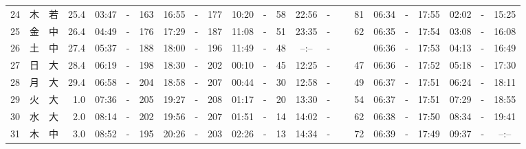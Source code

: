 \documentclass[12pt,a4j]{jsarticle}
\begin{document}
\begin{table}[htbp]
\begin{center}
{\begin{tabular}{|rc|cr|ccrccr|ccrccr|ccc|ccc|}
24 & 木 & 若 & 25.4 &  03:47 &-& 163 &  16:55 &-& 177 &  10:20 &-&  58 &  22:56 &-&  81 & 06:34 & -& 17:55 & 02:02 & -& 15:25 \\
25 & 金 & 中 & 26.4 &  04:49 &-& 176 &  17:29 &-& 187 &  11:08 &-&  51 &  23:35 &-&  62 & 06:35 & -& 17:54 & 03:08 & -& 16:08 \\
26 & 土 & 中 & 27.4 &  05:37 &-& 188 &  18:00 &-& 196 &  11:49 &-&  48 &  --:-- &-&~~~~~ & 06:36 & -& 17:53 & 04:13 & -& 16:49 \\
27 & 日 & 大 & 28.4 &  06:19 &-& 198 &  18:30 &-& 202 &  00:10 &-&  45 &  12:25 &-&  47 & 06:36 & -& 17:52 & 05:18 & -& 17:30 \\
28 & 月 & 大 & 29.4 &  06:58 &-& 204 &  18:58 &-& 207 &  00:44 &-&  30 &  12:58 &-&  49 & 06:37 & -& 17:51 & 06:24 & -& 18:11 \\
29 & 火 & 大 &  1.0 &  07:36 &-& 205 &  19:27 &-& 208 &  01:17 &-&  20 &  13:30 &-&  54 & 06:37 & -& 17:51 & 07:29 & -& 18:55 \\
30 & 水 & 大 &  2.0 &  08:14 &-& 202 &  19:56 &-& 207 &  01:51 &-&  14 &  14:02 &-&  62 & 06:38 & -& 17:50 & 08:34 & -& 19:41 \\
31 & 木 & 中 &  3.0 &  08:52 &-& 195 &  20:26 &-& 203 &  02:26 &-&  13 &  14:34 &-&  72 & 06:39 & -& 17:49 & 09:37 & -& --:-- \\
   \hline
   \end{tabular}}
   \end{center}
\end{table}
\newpage
\end{document}
